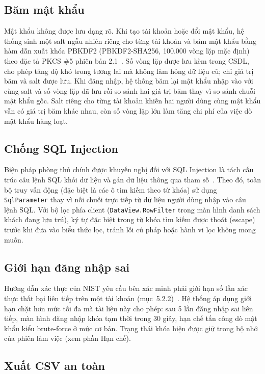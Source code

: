 \documentclass[14pt]{report}
\begin{document}
\subsection{Băm mật khẩu}

Mật khẩu không được lưu dạng rõ. Khi tạo tài khoản hoặc đổi mật khẩu, hệ thống sinh một salt ngẫu nhiên riêng cho từng tài khoản và băm mật khẩu bằng hàm dẫn xuất khóa PBKDF2 (PBKDF2-SHA256, 100.000 vòng lặp mặc định) theo đặc tả PKCS \#5 phiên bản 2.1~\cite{rfc8018}. Số vòng lặp được lưu kèm trong CSDL, cho phép tăng độ khó trong tương lai mà không làm hỏng dữ liệu cũ; chỉ giá trị băm và salt được lưu. Khi đăng nhập, hệ thống băm lại mật khẩu nhập vào với cùng salt và số vòng lặp đã lưu rồi so sánh hai giá trị băm thay vì so sánh chuỗi mật khẩu gốc. Salt riêng cho từng tài khoản khiến hai người dùng cùng mật khẩu vẫn có giá trị băm khác nhau, còn số vòng lặp lớn làm tăng chi phí của việc dò mật khẩu hàng loạt.

\subsection{Chống SQL Injection}

Biện pháp phòng thủ chính được khuyến nghị đối với SQL Injection là tách cấu trúc câu lệnh SQL khỏi dữ liệu và gán dữ liệu thông qua tham số~\cite{owasp-sqli}. Theo đó, toàn bộ truy vấn động (đặc biệt là các ô tìm kiếm theo từ khóa) sử dụng \texttt{SqlParameter} thay vì nối chuỗi trực tiếp từ dữ liệu người dùng nhập vào câu lệnh SQL. Với bộ lọc phía client (\texttt{DataView.RowFilter} trong màn hình danh sách khách đang lưu trú), ký tự đặc biệt trong từ khóa tìm kiếm được thoát (escape) trước khi đưa vào biểu thức lọc, tránh lỗi cú pháp hoặc hành vi lọc không mong muốn.

\subsection{Giới hạn đăng nhập sai}

Hướng dẫn xác thực của NIST yêu cầu bên xác minh phải giới hạn số lần xác thực thất bại liên tiếp trên một tài khoản (mục~5.2.2)~\cite{nist-63b}. Hệ thống áp dụng giới hạn chặt hơn mức tối đa mà tài liệu này cho phép: sau 5 lần đăng nhập sai liên tiếp, màn hình đăng nhập khóa tạm thời trong 30 giây, hạn chế tấn công dò mật khẩu kiểu brute-force ở mức cơ bản. Trạng thái khóa hiện được giữ trong bộ nhớ của phiên làm việc (xem phần Hạn chế).

\subsection{Xuất CSV an toàn}
\end{document}

